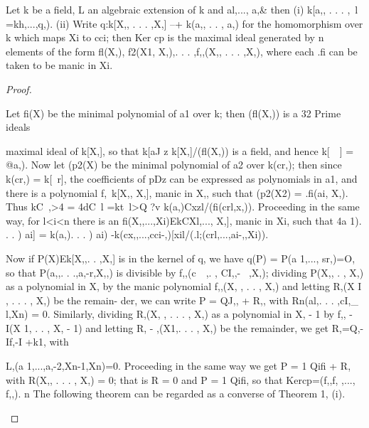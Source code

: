 \begin{theorem}[Theorem 5.1]\label{mcrt-auto-theorem-5-1}\uses{}
\begin{mathematicalrecord}
Let k be a field, L an algebraic extension of k and
al,...,  a,&      then
  (i) k[a,, . . . ,~l =kh,...,q,).
  (ii) Write q:k[X,,      . . . ,X,] --+ k(a,, . . , a,) for the homomorphism
over k which maps Xi to cci; then Ker cp is the maximal ideal generated
by n elements of the form fl(X,), f2(X1, X,),. . . ,f,,(X,, . . . ,X,), where
each .fi can be taken to be manic in Xi.
\end{mathematicalrecord}
\end{theorem}
\begin{proof}
\begin{mathematicalrecord}
Let fi(X) be the minimal polynomial of a1 over k; then (fl(X,)) is a
32         Prime ideals

maximal ideal of k[X,], so that k[aJ z k[X,]/(fl(X,)) is a field, and hence
k[~~] = @a,). Now let (p2(X) be the minimal polynomial of a2 over k(cr,);
then since k(cr,) = k[~r], the coefficients of pDz can be expressed as
polynomials in a1, and there is a polynomial f,~k[X,,  X,], manic in X,,
such that (p2(X2) = .fi(ai, X,). Thus
           kC~,>4 = 4dC~l                                                   =kt~l>Q ?v k(a,)Cxzl/(fi(crl,x,)).
Proceeding         in     the                          same way, for        l<i<n                          there     is   an
fi(X,,...,Xi)EkCXl,...,                                X,], manic in Xi, such that
           4a 1). . . ) ai] = k(a,). . . ) ai)
                            -k(cx,,...,cci-,)[xil/(.l;(crl,...,ai-,,Xi)).


Now if P(X)Ek[X,,.            . ,X,] is in the kernel of q, we have q(P) =
P(a 1,..., sr,)=O, so that P(a,,. . .,a,-r,X,,)       is divisible by f,,(c~~,. ,
CI,,-~ ,X,); dividing       P(X,, . , X,) as a polynomial           in X, by the
manic polynomial f,,(X, , . . , X,) and letting R,(X I , . . . , X,) be the remain-
der, we can write P = QJ,, + R,, with Rn(al,. . . ,cI,_ l,Xn) = 0. Similarly,
dividing R,(X, , . . . , X,) as a polynomial in X, - 1 by f,, - I(X 1, . . , X, - 1) and
letting R, - ,(X1,. . . , X,) be the remainder, we get
           R,=Q,-If,-I                            +k1,
with

           L,(a       1,...,a,-2,Xn-1,Xn)=0.
Proceeding in the same way we get P = 1 Qifi + R, with R(X,, . . . , X,) = 0;
that is R = 0 and P = 1 Qifi, so that Kercp=(f,,f,   ,..., f,,). n
   The following theorem can be regarded as a converse of Theorem 1, (i).
\end{mathematicalrecord}
\end{proof}


